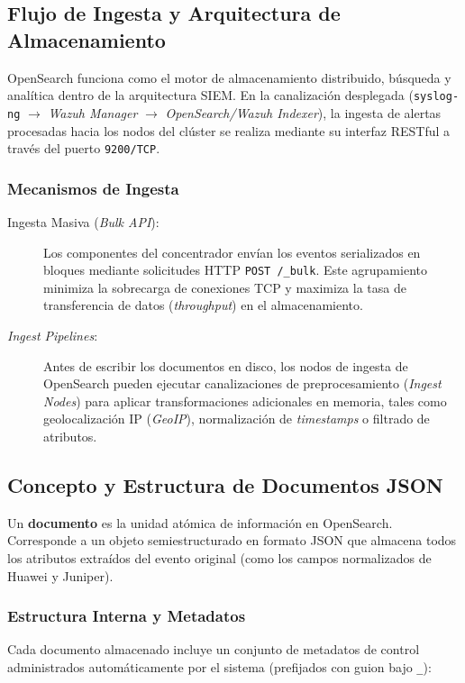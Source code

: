 \subsection{Flujo de Ingesta y Arquitectura de Almacenamiento}
OpenSearch funciona como el motor de almacenamiento distribuido, búsqueda y analítica dentro de la arquitectura SIEM. En la canalización desplegada (\texttt{syslog-ng} $\rightarrow$ \textit{Wazuh Manager} $\rightarrow$ \textit{OpenSearch/Wazuh Indexer}), la ingesta de alertas procesadas hacia los nodos del clúster se realiza mediante su interfaz RESTful a través del puerto \texttt{9200/TCP}.

\subsubsection{Mecanismos de Ingesta}
\begin{description}
    \item[Ingesta Masiva (\textit{Bulk API}):] Los componentes del concentrador envían los eventos serializados en bloques mediante solicitudes HTTP \texttt{POST /\_bulk}. Este agrupamiento minimiza la sobrecarga de conexiones TCP y maximiza la tasa de transferencia de datos (\textit{throughput}) en el almacenamiento.
    
    \item[\textit{Ingest Pipelines}:] Antes de escribir los documentos en disco, los nodos de ingesta de OpenSearch pueden ejecutar canalizaciones de preprocesamiento (\textit{Ingest Nodes}) para aplicar transformaciones adicionales en memoria, tales como geolocalización IP (\textit{GeoIP}), normalización de \textit{timestamps} o filtrado de atributos.
\end{description}

\subsection{Concepto y Estructura de Documentos JSON}
Un \textbf{documento} es la unidad atómica de información en OpenSearch. Corresponde a un objeto semiestructurado en formato JSON que almacena todos los atributos extraídos del evento original (como los campos normalizados de Huawei y Juniper).

\subsubsection{Estructura Interna y Metadatos}
Cada documento almacenado incluye un conjunto de metadatos de control administrados automáticamente por el sistema (prefijados con guion bajo \texttt{\_}):

